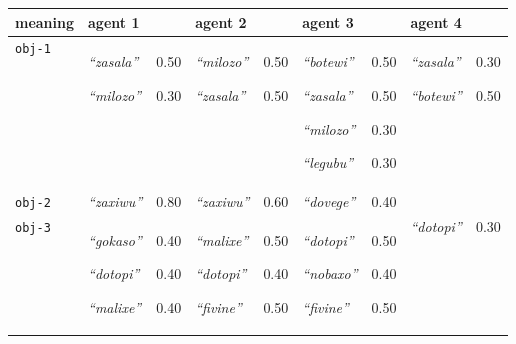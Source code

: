 
{\renewcommand{\arraystretch}{1.5}
\begin{tabular}{@{}p{1.2cm}|p{1.6cm}@{}p{0.8cm}@{}|p{1.6cm}@{}p{0.8cm}@{}|p{1.6cm}@{}p{0.8cm}@{}|p{1.6cm}@{}p{0.8cm}@{}}
meaning & agent 1 &  & agent 2 &  & agent 3 &  & agent 4 & \\
\hline
\texttt{obj-1}&\textit{``zasala''}


\textit{``milozo''}
&0.50

0.30&\textit{``milozo''}


\textit{``zasala''}
&0.50

0.50&\textit{``botewi''}


\textit{``zasala''}


\textit{``milozo''}


\textit{``legubu''}
&0.50

0.50

0.30

0.30&\textit{``zasala''}


\textit{``botewi''}
&0.30

0.50\\
\hline
\texttt{obj-2}&\textit{``zaxiwu''}
&0.80&\textit{``zaxiwu''}
&0.60&\textit{``dovege''}
&0.40&&\\
\hline
\texttt{obj-3}&\textit{``gokaso''}


\textit{``dotopi''}


\textit{``malixe''}
&0.40

0.40

0.40&\textit{``malixe''}


\textit{``dotopi''}


\textit{``fivine''}
&0.50

0.40

0.50&\textit{``dotopi''}


\textit{``nobaxo''}


\textit{``fivine''}
&0.50

0.40

0.50&\textit{``dotopi''}
&0.30
\end{tabular}}

